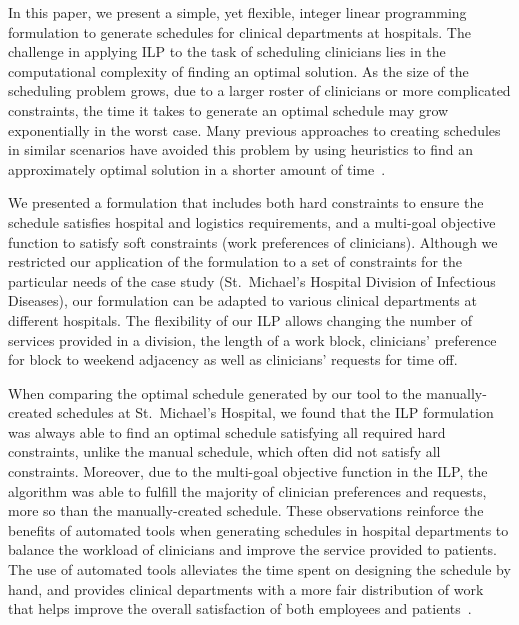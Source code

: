 In this paper, we present a simple, yet flexible, integer linear programming
formulation to generate schedules for clinical departments at hospitals.
The challenge in applying ILP to the task of scheduling clinicians lies in the
computational complexity of finding an optimal solution. As the size of the
scheduling problem grows, due to a larger roster of clinicians or more
complicated constraints, the time it takes to generate an optimal schedule may
grow exponentially in the worst case.
Many previous approaches to creating schedules in similar scenarios have avoided
this problem by using heuristics to find an approximately optimal solution 
in a shorter amount of time~\cite{burke_state_2004}.

We presented a formulation that includes both hard constraints to ensure the
schedule satisfies hospital and logistics requirements, and a multi-goal
objective function to satisfy soft constraints (work preferences of clinicians).
Although we restricted our application of the formulation to a set of
constraints for the particular needs of the case study (St.\ Michael's Hospital
Division of Infectious Diseases), our formulation can be adapted to various
clinical departments at different hospitals. The flexibility of our ILP allows
changing the number of services provided in a division, the length of a work
block, clinicians' preference for block to weekend adjacency as well as
clinicians' requests for time off.

When comparing the optimal schedule generated by our tool to the
manually-created schedules at St.\ Michael's Hospital, we found that the ILP
formulation was always able to find an optimal schedule satisfying all required
hard constraints, unlike the manual schedule, which often did not satisfy all
constraints. Moreover, due to the multi-goal objective function in
the ILP, the algorithm was able to fulfill the majority of clinician
preferences and requests, more so than the manually-created schedule. These
observations reinforce the benefits of automated tools when generating schedules
in hospital departments to balance the workload of clinicians and improve the
service provided to patients. The use of automated tools alleviates the time
spent on designing the schedule by hand, and provides clinical departments with
a more fair distribution of work that helps improve the overall satisfaction of
both employees and patients~\cite{silvestro_evaluation_2000}.

